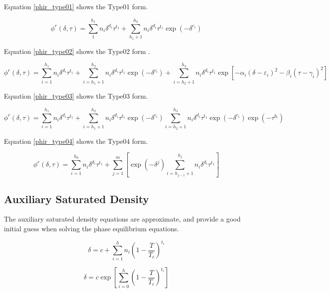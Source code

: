 \documentclass[oneside]{book}
\begin{document}
Equation \ref{phir_type01} shows the Type01 form.

\begin{equation}\label{phir_type01}
	\phi^r(\delta, \tau) = \sum^{h_1}_1 n_i \delta^{d_i} \tau^{t_1} + \sum_{h_1 + 1}^{h_2} n_i \delta^{d_i} \tau^{t_1} \exp(-\delta^{c_i})
\end{equation}

Equation \ref{phir_type02} shows the Type02 form \cite{osti_402357}.

\begin{equation}\label{phir_type02}
	\phi^r(\delta, \tau) = \sum^{h_1}_{i=1} n_i \delta^{d_i} \tau^{t_1} + 
	\sum_{i =h_1 + 1}^{h_2} n_i \delta^{d_i} \tau^{t_1} \exp(-\delta^{c_i}) + 
	\sum_{i = h_2 + 1}^{h_3} n_i \delta^{d_i} \tau^{t_1} \exp\left[-\alpha_i(\delta - \varepsilon_i)^2 - \beta_i(\tau - \gamma_i)^2 \right]
\end{equation}

Equation \ref{phir_type03} shows the Type03 form.

\begin{equation}\label{phir_type03}
	\phi^r(\delta, \tau) = 
	\sum^{h_1}_{i=1} n_i \delta^{d_i} \tau^{t_1} + 
	\sum_{i=h_1 + 1}^{h_2} n_i \delta^{d_i} \tau^{t_1} \exp(-\delta^{c_i})
	\sum_{i=h_2 + 1}^{h_3} n_i \delta^{d_i} \tau^{t_1} \exp(-\delta^{c_i}) \exp(-\tau^{b_i})
\end{equation}

Equation \ref{phir_type04} shows the Type04 form.

\begin{equation}\label{phir_type04}
	\phi^r(\delta, \tau) = 
	\sum^{h_0}_{i=1} n_i \delta^{d_i} \tau^{t_1} + 
	\sum^m_{j=1} \left[ \exp(-\delta^j) \sum^{h_j}_{i = h_{j-1} + 1} n_i \delta^{d_i} \tau^{t_1} \right]
\end{equation}

\subsection{Auxiliary Saturated Density}

The auxiliary saturated density equations are approximate, and provide a good initial guess when solving the phase equilibrium equations.

\begin{equation}
	\delta = c + \sum_{i=1}^h n_i  \left(1 - \frac{T}{T_c} \right)^{t_i}
\end{equation}


\begin{equation}
	\delta = c \exp \left[ \sum_{i=0}^h \left(1 - \frac{T}{T_c} \right)^{t_i} \right] 
\end{equation}
\end{document}
